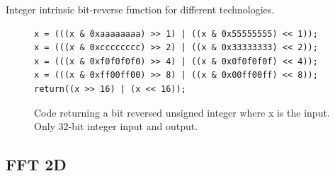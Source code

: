 \begin{table}
	\centering
	
	\caption{Integer intrinsic bit-reverse function for different technologies.}
	\label{tab:bit-reverse-intrinsics}
\end{table}

\begin{figure}
	\centering
	\lstset{language=C++}
	\begin{framed}
	\begin{lstlisting}
x = (((x & 0xaaaaaaaa) >> 1) | ((x & 0x55555555) << 1));
x = (((x & 0xcccccccc) >> 2) | ((x & 0x33333333) << 2));
x = (((x & 0xf0f0f0f0) >> 4) | ((x & 0x0f0f0f0f) << 4));
x = (((x & 0xff00ff00) >> 8) | ((x & 0x00ff00ff) << 8));
return((x >> 16) | (x << 16));
	\end{lstlisting}
	\end{framed}
	\caption{ Code returning a bit reversed unsigned integer where x is the input. Only 32-bit integer input and output. }
	\label{fig:code-bit-reverse}
\end{figure}

\subsection{FFT 2D}

